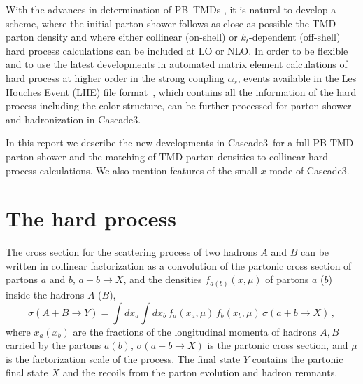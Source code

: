 \documentclass[11pt]{article} \usepackage{mystyle-new}
\def\prp{t}
\def\kt{\ensuremath{k_{\prp}}}
\def\cascade{{\sc Cascade3}}
\def\PB{{PB}}
\begin{document}
With the advances in determination of \PB\  TMDs  \cite{Hautmann:2017fcj,Hautmann:2017xtx}, it is natural to develop a scheme, where the initial parton shower follows as close as possible the TMD parton density and where either collinear (on-shell) or \kt-dependent (off-shell) hard process calculations can be included at LO or NLO.  In order to be flexible and to use the latest developments in automated matrix element calculations of hard process at higher order in the strong coupling $\alpha_s$, events available in the Les Houches Event (LHE) file format~\cite{Alwall:2006yp}, which contains all the information of the hard process including the color structure, can be further processed for parton shower and hadronization in  \cascade .

In this report we describe the new developments in \cascade\ for a full \PB -TMD parton shower and the matching of TMD parton densities to collinear hard process calculations. We also mention features of the small-$x$ mode of \cascade.



\section{The hard process}
\label{sec:HardProcess}
The cross section for the scattering process  of two hadrons $A$ and $B$ can be written in collinear factorization as a convolution of the partonic cross section of partons $a$ and $b$, $ a + b \to X$, and the densities $f_{a(b)}(x,\mu)$ of partons $a$ ($b$) inside the hadrons $A$ ($B$), 
\begin{equation}
\sigma(A+B\to Y ) =\int dx_a   \int dx_b   \,f_a(x_a,\mu) \,f_b(x_b,\mu) \,\sigma(a+b\to X) \, ,
\label{coll_x_section}
\end{equation}
where $x_a (x_b)$ are the fractions of the longitudinal momenta of hadrons  $A,B$  carried by the partons $a (b)$, $\sigma(a+b\to X)$ is the partonic cross section, and $\mu$ is the factorization scale of the process. The final state $Y$ contains the partonic final state $X$ and the recoils from the parton evolution and hadron remnants.
\end{document}
